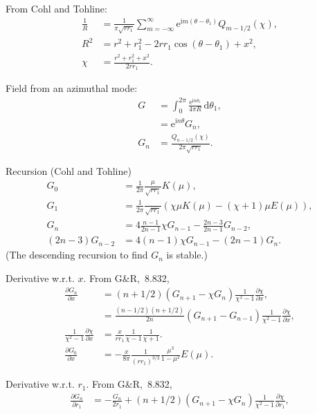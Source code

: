 \documentclass[a4paper,12pt]{article}
\newcommand{\D}{\mathrm{d}}
\newcommand{\E}{\mathrm{e}}
\newcommand{\I}{\mathrm{i}}
\begin{document}
From Cohl and Tohline:
\begin{align}
  \label{equ:basic}
  \frac{1}{R}
  &=
  \frac{1}{\pi\sqrt{rr_{1}}}
  \sum_{m=-\infty}^{\infty}
  \E^{\I m(\theta-\theta_{1})}
  Q_{m-1/2}(\chi),\\
  R^{2}
  &=
  r^{2} + r_{1}^{2} - 2rr_{1}\cos(\theta-\theta_{1}) +
  x^{2},\nonumber\\
  \chi
  &=
  \frac{r^{2} + r_{1}^{2} + x^{2}}{2rr_{1}}.
\end{align}

Field from an azimuthal mode:
\begin{align}
  \label{equ:gfunc}
  G
  &=
  \int_{0}^{2\pi}
  \frac{\E^{\I n\theta_{1}}}{4\pi R}\,\D \theta_{1},\\
  &=
  \E^{\I n\theta}G_{n},\\
  G_{n}
  &=
  \frac{Q_{n-1/2}(\chi)}{2\pi\sqrt{rr_{1}}}. 
\end{align}

Recursion (Cohl and Tohline)
\begin{align}
  \label{equ:recursion}
  G_{0}
  &=
  \frac{1}{2\pi}\frac{\mu}{\sqrt{rr_{1}}}K(\mu),\\
  G_{1}
  &=
  \frac{1}{2\pi}\frac{}{\sqrt{rr_{1}}}
  \left(
    \chi\mu K(\mu) - (\chi+1)\mu E(\mu)
  \right),\\
  G_{n}
  &=
  4\frac{n-1}{2n-1}\chi G_{n-1} - \frac{2n-3}{2n-1}G_{n-2},\\
  (2n-3)G_{n-2}
  &=
  4(n-1)\chi G_{n-1} - (2n-1)G_{n}.
\end{align}
(The descending recursion to find $G_{n}$ is stable.)

Derivative w.r.t. $x$. From G\&R,~8.832,
\begin{align}
  \label{equ:gfunc:dx}
  \frac{\partial G_{n}}{\partial x}
  &=
  (n+1/2)
  \left(G_{n+1} - \chi G_{n}\right)
  \frac{1}{\chi^{2}-1}\frac{\partial\chi}{\partial x},\\
  &= \frac{(n-1/2)(n+1/2)}{2n}
  \left(G_{n+1} - G_{n-1}\right)
  \frac{1}{\chi^{2}-1}\frac{\partial\chi}{\partial x},\\
  \frac{1}{\chi^{2}-1}\frac{\partial\chi}{\partial x}
  &=
  \frac{x}{rr_{1}}\frac{1}{\chi-1}\frac{1}{\chi+1}.\\
  \frac{\partial G_{0}}{\partial x}
  &=
  -\frac{x}{8\pi}\frac{1}{(rr_{1})^{3/2}}\frac{\mu^{3}}{1-\mu^{2}}E(\mu).
\end{align}

Derivative w.r.t. $r_{1}$. From G\&R,~8.832,
\begin{align}
  \label{equ:gfunc:dx}
  \frac{\partial G_{n}}{\partial r_{1}}
  &=
  -\frac{G_{n}}{2r_{1}}
  +
  (n+1/2)
  \left(G_{n+1} - \chi G_{n}\right)
  \frac{1}{\chi^{2}-1}\frac{\partial\chi}{\partial r_{1}},\\
\end{align}
\end{document}
